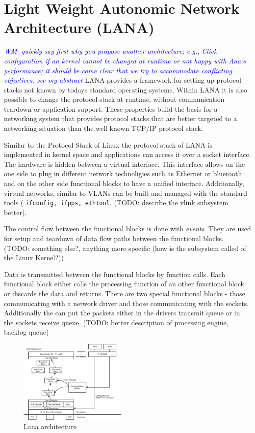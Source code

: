 \documentclass{sig-alternate}
\newcommand{\wolfgang}[1]{\textcolor{blue}{\emph{WM: #1}}}
\begin{document}
\section{Light Weight Autonomic Network Architecture (LANA)}

\wolfgang{quickly say first why you propose another architecture; e.g., Click configuration if an kernel cannot be changed at runtime or not happy with Ana's performance; it should be come clear that we try to accommodate conflicting objectives, see my abstract}
LANA provides a framework for setting up protocol stacks not known by todays standard operating systems. Within LANA it is also possible to change the protocol stack at runtime, without communication teardown or application support. These properties build the basis for a networking system that provides protocol stacks that are better targeted to a networking situation than the well known TCP/IP protocol stack.
 
Similar to the Protocol Stack of Linux the protocol stack of LANA is implemented in kernel space and applications can access it over a socket interface. The hardware is hidden between a virtual interface. This interface allows on the one side to plug in different network technoligies such as Ethernet or bluetooth and on the other side functional blocks to have a unified interface. Additionally, virtual networks, similar to VLANs can be built and managed with the standard tools ( \texttt{ifconfig, ifpps, ethtool}. (TODO: descirbe the vlink subsystem better).

The control flow between the functional blocks is done with \textit{events}. They are used for setup and teardown of data flow paths between the functional blocks. (TODO: something else?, anything more specific (how is the subsystem called of the Linux Kernel?))

Data is transmitted between the functional blocks by function calls. Each functional block either calls the processing function of an other functional block or discards the data and returns. There are two special functional blocks - those communicating with a network driver and those communicating with the sockets. Additionally the can put the packets either in the drivers transmit queue or in the sockets receive queue. (TODO: better description of processing engine, backlog queue)


\begin{figure}
\centering
\includegraphics[width=0.47\textwidth]{figures/architecture.pdf}
\caption{Lana architecture}
\label{fig:architecture}
\end{figure}
\end{document}

